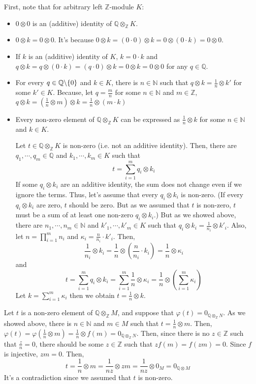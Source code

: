 \documentclass{article}
\newcommand{\bs}{\char`\\}
\newcommand{\bbN}{\mathbb{N}}
\newcommand{\bbQ}{\mathbb{Q}}
\newcommand{\bbZ}{\mathbb{Z}}
\begin{document}
First, note that for arbitrary left \(\bbZ\)-module \(K\):
\begin{itemize}
\item \(0 \otimes 0\) is an (additive) identity of \(\bbQ \otimes_\bbZ K\).
\item \(0 \otimes k = 0 \otimes 0\).
  It's because \(0 \otimes k = (0 \cdot 0) \otimes k = 0 \otimes (0 \cdot k) = 0 \otimes 0\).
\item If \(k\) is an (additive) identity of \(K\), \(k = 0 \cdot k\) and \(q \otimes k = q \otimes (0 \cdot k) = (q \cdot 0) \otimes k = 0 \otimes k = 0 \otimes 0\) for any \(q \in \bbQ\).
\item For every \(q \in \bbQ \bs \{0\}\) and \(k \in K\), there is \(n \in \bbN\) such that \(q \otimes k = \frac{1}{n} \otimes k'\) for some \(k' \in K\). Because, let \(q = \frac{m}{n}\) for some \(n \in \bbN\) and \(m \in \bbZ\),
\(q \otimes k = (\frac{1}{n} \otimes m) \otimes k = \frac{1}{n} \otimes (m \cdot k)\)
\item Every non-zero element of \(\bbQ \otimes_\bbZ K\) can be expressed as \(\frac{1}{n} \otimes k\) for some \(n \in \bbN\) and \(k \in K\).

Let \(t \in \bbQ \otimes_\bbZ K\) is non-zero (i.e. not an additive identity). 
Then, there are \(q_1, \cdots, q_m \in \bbQ\) and \(k_1, \cdots, k_m \in K\)
such that
\[t = \sum_{i=1}^m q_i \otimes k_i\]
If some \(q_i \otimes k_i\) are an additive identity, the sum does not change even if we ignore the terms.
Thus, let's assume that every \(q_i \otimes k_i\) is non-zero.
(If every \(q_i \otimes k_i\) are zero, \(t\) should be zero. But as we assumed that \(t\) is non-zero, \(t\) must be a sum of at least one non-zero \(q_i \otimes k_i\).)
But as we showed above, there are \(n_1, \cdots, n_m \in \bbN\) and \(k'_1, \cdots, k'_m \in K\) such that \(q_i \otimes k_i = \frac{1}{n_i} \otimes k'_i\).
Also, let \(n = \prod_{i = 1}^m n_i\) and \(\kappa_i = \frac{n}{n_i} \cdot k'_i\).
Then,
\[\frac{1}{n_i} \otimes k_i = \frac{1}{n} \otimes (\frac{n}{n_i} \cdot k_i) = \frac{1}{n} \otimes \kappa_i\]
and
\[t = \sum_{i=1}^m q_i \otimes k_i = \sum_{i=1}^m \frac{1}{n} \otimes \kappa_i = \frac{1}{n} \otimes (\sum_{i=1}^m \kappa_i)\]
Let \(k = \sum_{i=1}^m \kappa_i\) then we obtain \(t = \frac{1}{n} \otimes k\).
\end{itemize}

Let \(t\) is a non-zero element of \(\bbQ \otimes_\bbZ M\),
and suppose that \(\varphi(t) = 0_{\bbQ \otimes_\bbZ N}\).
As we showed above, there is \(n \in \bbN\) and \(m \in M\) such that \(t = \frac{1}{n} \otimes m\).
Then, \(\varphi(t) = \varphi(\frac{1}{n} \otimes m) = \frac{1}{n} \otimes f(m) = 0_{\bbQ \otimes_\bbZ N}\).
Then, since there is no \(z \in \bbZ\) such that \(\frac{z}{n} = 0\), there should be some \(z \in \bbZ\) such that \(zf(m) = f(zm) = 0\).
Since \(f\) is injective, \(zm = 0\).
Then,
\[t = \frac{1}{n} \otimes m = \frac{1}{nz} \otimes zm = \frac{1}{nz} \otimes 0_M = 0_{\bbQ \otimes M}\]
It's a contradiction since we assumed that \(t\) is non-zero.
\end{document}
